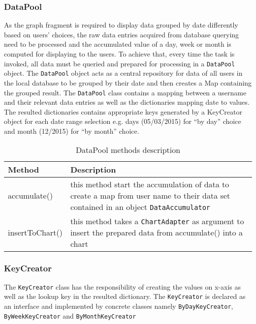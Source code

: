 \subsubsection{DataPool}
As the graph fragment is required to display data grouped by date differently based on users' choices, the raw data
entries acquired from database querying need to be processed and the accumulated value of a day, week or month is
computed for displaying to the users. To achieve that, every time the task is invoked, all data must be queried and
prepared for processing in a \texttt{DataPool} object. The \texttt{DataPool} object acts as a central repository for
data of all users in the local database to be grouped by their date and then creates a Map containing the grouped
result. The \texttt{DataPool} class contains a mapping between a username and their relevant data entries as well as the
dictionaries mapping date to values. The resulted dictionaries contains appropriate keys generated by a KeyCreator
object for each date range selection e.g. days (05/03/2015) for ``by day'' choice and month (12/2015) for ``by month''
choice.

\begin{table}[h]
\begin{center}
    \begin{tabular}{| l | p{12cm} |}
        \hline Method & Description \\
        \hline accumulate() & 
            this method start the accumulation of data to create a map from user name to their data set contained in an
            object \texttt{DataAccumulator} \\
        \hline insertToChart() &
            this method takes a \texttt{ChartAdapter} as argument to insert the prepared data from accumulate() into a
            chart \\
        \hline
    \end{tabular}
    \caption{DataPool methods description}
\end{center}
\end{table}

\subsubsection{KeyCreator}
The \texttt{KeyCreator} class has the responsibility of creating the values on x-axis as well as the lookup key in the
resulted dictionary. The \texttt{KeyCreator} is declared as an interface and implemented by concrete classes namely
\texttt{ByDayKeyCreator}, \texttt{ByWeekKeyCreator} and \texttt{ByMonthKeyCreator}

